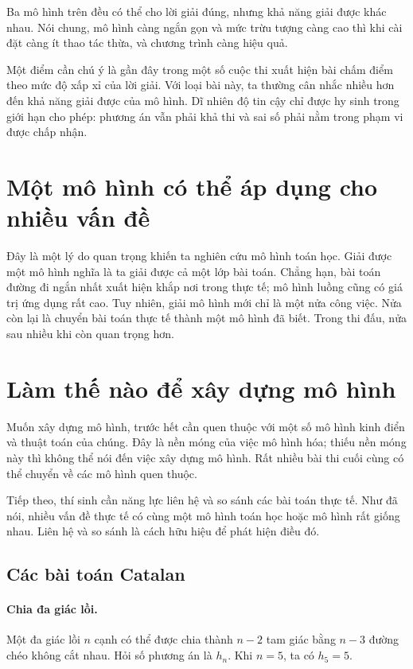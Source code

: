 \documentclass[11pt]{article}
\begin{document}
Ba mô hình trên đều có thể cho lời giải đúng, nhưng khả năng giải được khác
nhau. Nói chung, mô hình càng ngắn gọn và mức trừu tượng càng cao thì khi cài
đặt càng ít thao tác thừa, và chương trình càng hiệu quả.

Một điểm cần chú ý là gần đây trong một số cuộc thi xuất hiện bài chấm điểm
theo mức độ xấp xỉ của lời giải. Với loại bài này, ta thường cân nhắc nhiều
hơn đến khả năng giải được của mô hình. Dĩ nhiên độ tin cậy chỉ được hy sinh
trong giới hạn cho phép: phương án vẫn phải khả thi và sai số phải nằm trong
phạm vi được chấp nhận.

\section{Một mô hình có thể áp dụng cho nhiều vấn đề}

Đây là một lý do quan trọng khiến ta nghiên cứu mô hình toán học. Giải được
một mô hình nghĩa là ta giải được cả một lớp bài toán. Chẳng hạn, bài toán
đường đi ngắn nhất xuất hiện khắp nơi trong thực tế; mô hình luồng cũng có giá
trị ứng dụng rất cao. Tuy nhiên, giải mô hình mới chỉ là một nửa công việc.
Nửa còn lại là chuyển bài toán thực tế thành một mô hình đã biết. Trong thi
đấu, nửa sau nhiều khi còn quan trọng hơn.

\section{Làm thế nào để xây dựng mô hình}

Muốn xây dựng mô hình, trước hết cần quen thuộc với một số mô hình kinh điển
và thuật toán của chúng. Đây là nền móng của việc mô hình hóa; thiếu nền móng
này thì không thể nói đến việc xây dựng mô hình. Rất nhiều bài thi cuối cùng
có thể chuyển về các mô hình quen thuộc.

Tiếp theo, thí sinh cần năng lực liên hệ và so sánh các bài toán thực tế. Như
đã nói, nhiều vấn đề thực tế có cùng một mô hình toán học hoặc mô hình rất
giống nhau. Liên hệ và so sánh là cách hữu hiệu để phát hiện điều đó.

\subsection{Các bài toán Catalan}

\paragraph{Chia đa giác lồi.}
Một đa giác lồi \(n\) cạnh có thể được chia thành \(n-2\) tam giác bằng
\(n-3\) đường chéo không cắt nhau. Hỏi số phương án là \(h_n\). Khi \(n=5\),
ta có \(h_5=5\).
\end{document}
